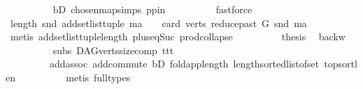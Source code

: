 \begin{isabellebody}
\ \ \ \ \ \ \ \ \isamarkupfalse%
\ bD\ chosen{\isacharunderscore}{\kern0pt}map{\isacharunderscore}{\kern0pt}simps{\isacharparenleft}{\kern0pt}{}{\isacharparenright}{\kern0pt}\ pp{\isacharunderscore}{\kern0pt}in\isanewline
\ \ \ \ \ \ \ \ \isamarkupfalse%
\ fastforce\ \ \isanewline
\ \ \ \ \ \ \isamarkupfalse%
\ \isamarkupfalse%
\ {\isachardoublequoteopen}length\ {\isacharparenleft}{\kern0pt}snd\ {\isacharparenleft}{\kern0pt}add{\isacharunderscore}{\kern0pt}set{\isacharunderscore}{\kern0pt}list{\isacharunderscore}{\kern0pt}tuple\ ma{\isacharparenright}{\kern0pt}{\isacharparenright}{\kern0pt}\ {\isacharequal}{\kern0pt}\ {}\ {\isacharplus}{\kern0pt}\ card\ {\isacharparenleft}{\kern0pt}verts\ {\isacharparenleft}{\kern0pt}reduce{\isacharunderscore}{\kern0pt}past\ G\ {\isacharparenleft}{\kern0pt}snd\ ma{\isacharparenright}{\kern0pt}{\isacharparenright}{\kern0pt}{\isacharparenright}{\kern0pt}{\isachardoublequoteclose}\isanewline
\ \ \ \ \ \ \ \ \isamarkupfalse%
\ {\isacharparenleft}{\kern0pt}metis\ add{\isacharunderscore}{\kern0pt}set{\isacharunderscore}{\kern0pt}list{\isacharunderscore}{\kern0pt}tuple{\isacharunderscore}{\kern0pt}length\ plus{\isacharunderscore}{\kern0pt}{}{\isacharunderscore}{\kern0pt}eq{\isacharunderscore}{\kern0pt}Suc\ prod{\isachardot}{\kern0pt}collapse{\isacharparenright}{\kern0pt}\isanewline
\ \ \ \ \ \ \isamarkupfalse%
\ \isamarkupfalse%
\ {\isacharquery}{\kern0pt}thesis\ \isamarkupfalse%
\ backw\isanewline
\ \ \ \ \ \ \ \ \isamarkupfalse%
\ subs\ DAG{\isachardot}{\kern0pt}verts{\isacharunderscore}{\kern0pt}size{\isacharunderscore}{\kern0pt}comp\ ttt\isanewline
\ \ \ \ \ \ \ \ \ add{\isachardot}{\kern0pt}assoc\ add{\isachardot}{\kern0pt}commute\ bD\ fold{\isacharunderscore}{\kern0pt}app{\isacharunderscore}{\kern0pt}length\ length{\isacharunderscore}{\kern0pt}sorted{\isacharunderscore}{\kern0pt}list{\isacharunderscore}{\kern0pt}of{\isacharunderscore}{\kern0pt}set\ top{\isacharunderscore}{\kern0pt}sort{\isacharunderscore}{\kern0pt}len\isanewline
\ \ \ \ \ \ \ \ \isamarkupfalse%
\ {\isacharparenleft}{\kern0pt}metis\ {\isacharparenleft}{\kern0pt}full{\isacharunderscore}{\kern0pt}types{\isacharparenright}{\kern0pt}{\isacharparenright}{\kern0pt}\ \ \ \isanewline
\ \ \ \ \isamarkupfalse%
\isanewline
\ \ \isamarkupfalse%
\isanewline
{}\isamarkupfalse%
%
\endisatagproof
{\isafoldproof}%
%
\isadelimproof

\end{isabellebody}
